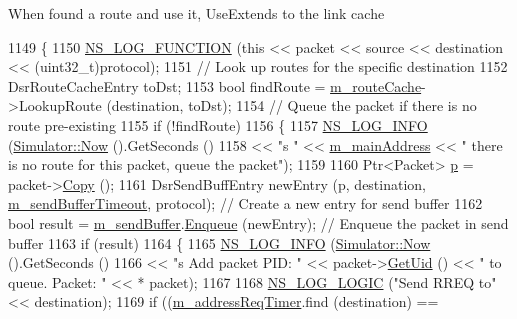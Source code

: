 When found a route and use it, Use\+Extends to the link cache 
\begin{DoxyCode}
1149 \{
1150   \hyperlink{log-macros-disabled_8h_a90b90d5bad1f39cb1b64923ea94c0761}{NS\_LOG\_FUNCTION} (\textcolor{keyword}{this} << packet << source << destination << (uint32\_t)protocol);
1151   \textcolor{comment}{// Look up routes for the specific destination}
1152   DsrRouteCacheEntry toDst;
1153   \textcolor{keywordtype}{bool} findRoute = \hyperlink{classns3_1_1dsr_1_1DsrRouting_ac409bdb961b9fff0fb63ebd026be99ad}{m\_routeCache}->LookupRoute (destination, toDst);
1154   \textcolor{comment}{// Queue the packet if there is no route pre-existing}
1155   \textcolor{keywordflow}{if} (!findRoute)
1156     \{
1157       \hyperlink{group__logging_gafbd73ee2cf9f26b319f49086d8e860fb}{NS\_LOG\_INFO} (\hyperlink{classns3_1_1Simulator_ac3178fa975b419f7875e7105be122800}{Simulator::Now} ().GetSeconds ()
1158                    << \textcolor{stringliteral}{"s "} << \hyperlink{classns3_1_1dsr_1_1DsrRouting_a73182b5edee2d8460f28855e058fc9a0}{m\_mainAddress} << \textcolor{stringliteral}{" there is no route for this packet, queue the
       packet"});
1159 
1160       Ptr<Packet> \hyperlink{lte__link__budget_8m_ac9de518908a968428863f829398a4e62}{p} = packet->\hyperlink{classns3_1_1Packet_a5d5c70802a5f77fc5f0001e0cfc1898b}{Copy} ();
1161       DsrSendBuffEntry newEntry (p, destination, \hyperlink{classns3_1_1dsr_1_1DsrRouting_a1f89794801db0336d92e4ca85fbc09a7}{m\_sendBufferTimeout}, protocol);     \textcolor{comment}{//
       Create a new entry for send buffer}
1162       \textcolor{keywordtype}{bool} result = \hyperlink{classns3_1_1dsr_1_1DsrRouting_a887ae39d7060171753c0605d5c120549}{m\_sendBuffer}.\hyperlink{classns3_1_1dsr_1_1DsrSendBuffer_aac846f6a38f6fc6431c8483103ed5121}{Enqueue} (newEntry);     \textcolor{comment}{// Enqueue the packet in send
       buffer}
1163       \textcolor{keywordflow}{if} (result)
1164         \{
1165           \hyperlink{group__logging_gafbd73ee2cf9f26b319f49086d8e860fb}{NS\_LOG\_INFO} (\hyperlink{classns3_1_1Simulator_ac3178fa975b419f7875e7105be122800}{Simulator::Now} ().GetSeconds ()
1166                        << \textcolor{stringliteral}{"s Add packet PID: "} << packet->\hyperlink{classns3_1_1Packet_a1f212c825b50e54d94f5b9ae99592e6a}{GetUid} () << \textcolor{stringliteral}{" to queue. Packet: "} << *
      packet);
1167 
1168           \hyperlink{group__logging_ga88acd260151caf2db9c0fc84997f45ce}{NS\_LOG\_LOGIC} (\textcolor{stringliteral}{"Send RREQ to"} << destination);
1169           \textcolor{keywordflow}{if} ((\hyperlink{classns3_1_1dsr_1_1DsrRouting_a47174823b0622573b681afc40d6ea558}{m\_addressReqTimer}.find (destination) == 

\end{DoxyCode}
